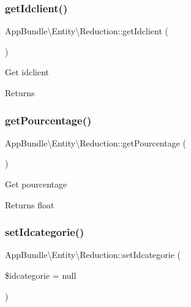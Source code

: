 \subsubsection{\texorpdfstring{get\+Idclient()}{getIdclient()}}
{\footnotesize\ttfamily App\+Bundle\textbackslash{}\+Entity\textbackslash{}\+Reduction\+::get\+Idclient (\begin{DoxyParamCaption}{ }\end{DoxyParamCaption})}

Get idclient

\begin{DoxyReturn}{Returns}

\end{DoxyReturn}
\mbox{\label{class_app_bundle_1_1_entity_1_1_reduction_aad0adbb7e6a97279483bbdfe45ab60db}} 
\subsubsection{\texorpdfstring{get\+Pourcentage()}{getPourcentage()}}
{\footnotesize\ttfamily App\+Bundle\textbackslash{}\+Entity\textbackslash{}\+Reduction\+::get\+Pourcentage (\begin{DoxyParamCaption}{ }\end{DoxyParamCaption})}

Get pourcentage

\begin{DoxyReturn}{Returns}
float 
\end{DoxyReturn}
\mbox{\label{class_app_bundle_1_1_entity_1_1_reduction_a67708616e74e2c019404f1343f65f9df}} 
\subsubsection{\texorpdfstring{set\+Idcategorie()}{setIdcategorie()}}
{\footnotesize\ttfamily App\+Bundle\textbackslash{}\+Entity\textbackslash{}\+Reduction\+::set\+Idcategorie (\begin{DoxyParamCaption}\item[{\textbackslash{}\hyperlink{class_app_bundle_1_1_entity_1_1_categorie}{App\+Bundle\textbackslash{}\+Entity\textbackslash{}\+Categorie}}]{\$idcategorie = {\ttfamily null} }\end{DoxyParamCaption})}


